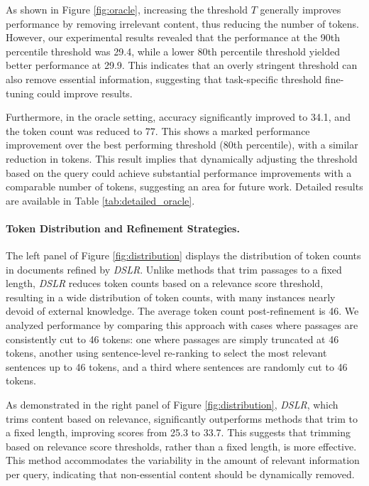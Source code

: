 As shown in Figure \ref{fig:oracle}, increasing the threshold \( T \) generally improves performance by removing irrelevant content, thus reducing the number of tokens. However, our experimental results revealed that the performance at the 90th percentile threshold was 29.4, while a lower 80th percentile threshold yielded better performance at 29.9. This indicates that an overly stringent threshold can also remove essential information, suggesting that task-specific threshold fine-tuning could improve results.

Furthermore, in the oracle setting, accuracy significantly improved to 34.1, and the token count was reduced to 77. This shows a marked performance improvement over the best performing threshold (80th percentile), with a similar reduction in tokens. This result implies that dynamically adjusting the threshold based on the query could achieve substantial performance improvements with a comparable number of tokens, suggesting an area for future work. Detailed results are available in Table \ref{tab:detailed_oracle}.

\label{various_threshold}

 

\paragraph{Token Distribution and Refinement Strategies.}


The left panel of Figure \ref{fig:distribution} displays the distribution of token counts in documents refined by \textit{DSLR}. Unlike methods that trim passages to a fixed length, \textit{DSLR} reduces token counts based on a relevance score threshold, resulting in a wide distribution of token counts, with many instances nearly devoid of external knowledge. The average token count post-refinement is 46. We analyzed performance by comparing this approach with cases where passages are consistently cut to 46 tokens: one where passages are simply truncated at 46 tokens, another using sentence-level re-ranking to select the most relevant sentences up to 46 tokens, and a third where sentences are randomly cut to 46 tokens.

As demonstrated in the right panel of Figure \ref{fig:distribution}, \textit{DSLR}, which trims content based on relevance, significantly outperforms methods that trim to a fixed length, improving scores from 25.3 to 33.7. This suggests that trimming based on relevance score thresholds, rather than a fixed length, is more effective. This method accommodates the variability in the amount of relevant information per query, indicating that non-essential content should be dynamically removed.







